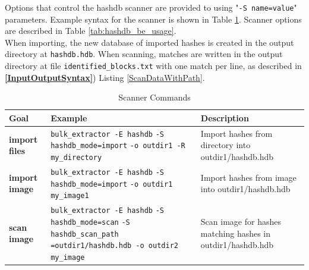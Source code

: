 \documentclass[11pt,fleqn]{article} %
\begin{document}
Options that control the hashdb scanner are provided to \bulk using "\verb+-S name=value+" parameters.  Example syntax for the \bulk \hdb scanner is shown in Table \ref{tab:hashdbScanner}.  Scanner options are described in Table \ref{tab:hashdb_be_usage}.\\

When importing, the new database of imported hashes is created in the output directory at \verb+hashdb.hdb+.  When scanning, matches are written in the output directory at file \verb+identified_blocks.txt+ with one match per line, as described in \textbf{\autoref{InputOutputSyntax}}) Listing \ref{ScanDataWithPath}.\\

\begin{table}[!ht]
\centering
\caption{\bulk \hdb Scanner Commands}
\label{tab:hashdbScanner}
\begin{tabular}{|p{3.5 cm}|p{6 cm}|p{4 cm}|}
\hline \hline
\textbf{Goal} & \textbf{Example} & \textbf{Description} \\
\hline
\textbf{import files} & \verb+bulk_extractor -E hashdb+ \verb+-S hashdb_mode=import+ \verb+-o outdir1 -R my_directory+ & Import hashes from directory into outdir1/hashdb.hdb\\
\hline
\textbf{import image} & \verb+bulk_extractor -E hashdb+ \verb+-S hashdb_mode=import+ \verb+-o outdir1 my_image1+ & Import hashes from image into outdir1/hashdb.hdb\\
\hline
\textbf{scan image} & \verb+bulk_extractor -E hashdb+ \verb+-S hashdb_mode=scan+ \verb+-S hashdb_scan_path+ \verb+=outdir1/hashdb.hdb -o outdir2+ \verb+my_image+ & Scan image for hashes matching hashes in outdir1/hashdb.hdb\\
\hline
\end{tabular}
\end{table}
\end{document}
